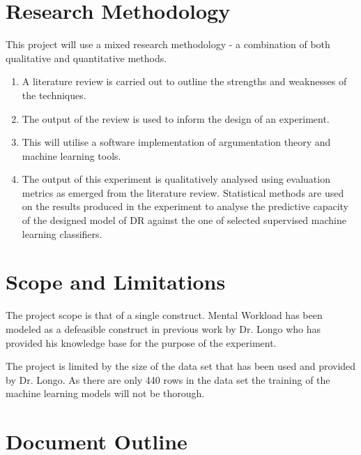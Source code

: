 
\section{Research Methodology}


This project will use a mixed research methodology - a combination of both qualitative and quantitative methods. 

\begin{enumerate}
  \item A literature review is carried out to outline the strengths and weaknesses of the techniques.
  \item The output of the review is used to inform the design of an experiment.
  \item This will utilise a software implementation of argumentation theory and machine learning tools. 
  \item  The output of this experiment is qualitatively analysed using evaluation metrics as emerged from the literature review. Statistical methods are used on the results produced in the experiment to analyse the predictive capacity of the designed model of DR against the one of selected supervised machine learning classifiers.
\end{enumerate}


\section{Scope and Limitations}

The project scope is that of a single construct. Mental Workload has been modeled as a defeasible construct in previous work by Dr. Longo who has provided his knowledge base for the purpose of the experiment. 

The project is limited by the size of the data set that has been used and provided by Dr. Longo. As there are only 440 rows in the data set the training of the machine learning models will not be thorough. 

\section{Document Outline}

